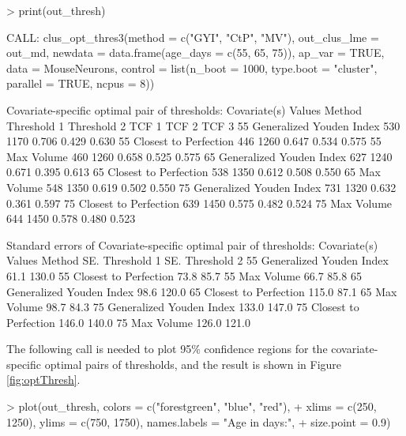{
\begin{example}
> print(out_thresh)

CALL: clus_opt_thres3(method = c("GYI", "CtP", "MV"), out_clus_lme = out_md, 
    newdata = data.frame(age_days = c(55, 65, 75)), ap_var = TRUE, 
    data = MouseNeurons, control = list(n_boot = 1000, type.boot = "cluster", 
        parallel = TRUE, ncpus = 8))
 
Covariate-specific optimal pair of thresholds: 
 Covariate(s) Values                   Method Threshold 1 Threshold 2 TCF 1 TCF 2 TCF 3
                  55 Generalized Youden Index         530        1170 0.706 0.429 0.630
                  55    Closest to Perfection         446        1260 0.647 0.534 0.575
                  55               Max Volume         460        1260 0.658 0.525 0.575
                  65 Generalized Youden Index         627        1240 0.671 0.395 0.613
                  65    Closest to Perfection         538        1350 0.612 0.508 0.550
                  65               Max Volume         548        1350 0.619 0.502 0.550
                  75 Generalized Youden Index         731        1320 0.632 0.361 0.597
                  75    Closest to Perfection         639        1450 0.575 0.482 0.524
                  75               Max Volume         644        1450 0.578 0.480 0.523

Standard errors of Covariate-specific optimal pair of thresholds: 
 Covariate(s) Values                   Method SE. Threshold 1 SE. Threshold 2
                  55 Generalized Youden Index            61.1           130.0
                  55    Closest to Perfection            73.8            85.7
                  55               Max Volume            66.7            85.8
                  65 Generalized Youden Index            98.6           120.0
                  65    Closest to Perfection           115.0            87.1
                  65               Max Volume            98.7            84.3
                  75 Generalized Youden Index           133.0           147.0
                  75    Closest to Perfection           146.0           140.0
                  75               Max Volume           126.0           121.0
\end{example}
}
\noindent
The following call is needed to plot 95\% confidence regions for the covariate-specific optimal pairs of thresholds, and the result is shown in Figure \ref{fig:optThresh}.
{
\begin{example}
> plot(out_thresh, colors = c("forestgreen", "blue", "red"),
+      xlims = c(250, 1250), ylims = c(750, 1750), names.labels = "Age in days:",
+      size.point = 0.9)
\end{example}
}
